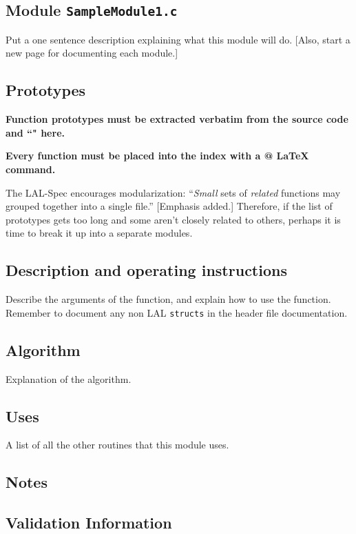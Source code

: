 \documentclass[oneside]{book}
\begin{document}
\newpage

\subsection{Module {\texttt {SampleModule1.c}}}
Put a one sentence description explaining what this module will do. 
[Also, start a new page for documenting each module.]

\subsection*{Prototypes}
{\bf Function prototypes must be extracted verbatim from
the source code and ``{\verb@@}" here.}

\noindent
{\bf Every function must be placed into the index with
a \verb@{}@ {\LaTeX} command.}

The LAL-Spec encourages modularization: ``{\it Small} sets of {\it
related} functions may grouped together into a single file.''
[Emphasis added.] Therefore, if the list of prototypes gets too long
and some aren't closely related to others, perhaps it is time to break
it up into a separate modules.

\subsection*{Description and operating instructions}
Describe the arguments of the function, and explain how to use the function.
Remember to document any non LAL {\tt structs} in the header
file documentation.

\subsection*{Algorithm}
Explanation of the algorithm.

\subsection*{Uses}
A list of all the other routines that this module uses.

\subsection*{Notes}

\subsection*{Validation Information}
\end{document}
